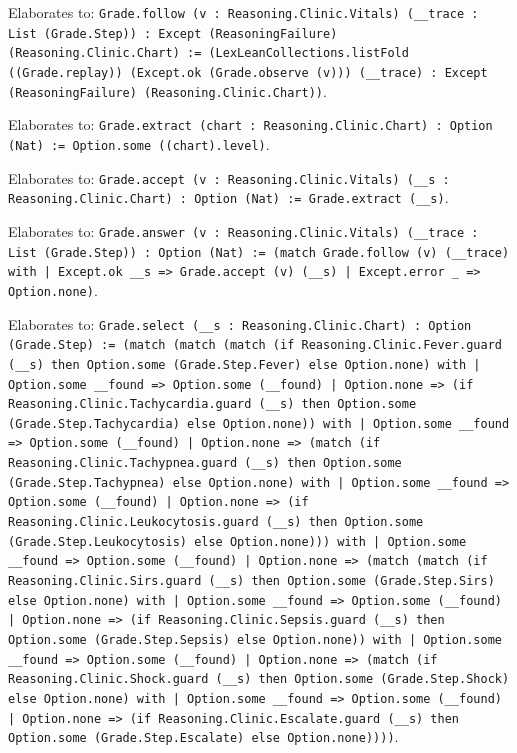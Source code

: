 \documentclass[11pt]{article}
\begin{document}
\noindent Elaborates to: \texttt{Grade.follow (v : Reasoning.Clinic.Vitals) (\_\_trace : List (Grade.Step)) : Except (ReasoningFailure) (Reasoning.Clinic.Chart) := (LexLeanCollections.listFold ((Grade.replay)) (Except.ok (Grade.observe (v))) (\_\_trace) : Except (ReasoningFailure) (Reasoning.Clinic.Chart))}.\par
\noindent Elaborates to: \texttt{Grade.extract (chart : Reasoning.Clinic.Chart) : Option (Nat) := Option.some ((chart).level)}.\par
\noindent Elaborates to: \texttt{Grade.accept (v : Reasoning.Clinic.Vitals) (\_\_s : Reasoning.Clinic.Chart) : Option (Nat) := Grade.extract (\_\_s)}.\par
\noindent Elaborates to: \texttt{Grade.answer (v : Reasoning.Clinic.Vitals) (\_\_trace : List (Grade.Step)) : Option (Nat) := (match Grade.follow (v) (\_\_trace) with | Except.ok \_\_s => Grade.accept (v) (\_\_s) | Except.error \_ => Option.none)}.\par
\noindent Elaborates to: \texttt{Grade.select (\_\_s : Reasoning.Clinic.Chart) : Option (Grade.Step) := (match (match (match (if Reasoning.Clinic.Fever.guard (\_\_s) then Option.some (Grade.Step.Fever) else Option.none) with | Option.some \_\_found => Option.some (\_\_found) | Option.none => (if Reasoning.Clinic.Tachycardia.guard (\_\_s) then Option.some (Grade.Step.Tachycardia) else Option.none)) with | Option.some \_\_found => Option.some (\_\_found) | Option.none => (match (if Reasoning.Clinic.Tachypnea.guard (\_\_s) then Option.some (Grade.Step.Tachypnea) else Option.none) with | Option.some \_\_found => Option.some (\_\_found) | Option.none => (if Reasoning.Clinic.Leukocytosis.guard (\_\_s) then Option.some (Grade.Step.Leukocytosis) else Option.none))) with | Option.some \_\_found => Option.some (\_\_found) | Option.none => (match (match (if Reasoning.Clinic.Sirs.guard (\_\_s) then Option.some (Grade.Step.Sirs) else Option.none) with | Option.some \_\_found => Option.some (\_\_found) | Option.none => (if Reasoning.Clinic.Sepsis.guard (\_\_s) then Option.some (Grade.Step.Sepsis) else Option.none)) with | Option.some \_\_found => Option.some (\_\_found) | Option.none => (match (if Reasoning.Clinic.Shock.guard (\_\_s) then Option.some (Grade.Step.Shock) else Option.none) with | Option.some \_\_found => Option.some (\_\_found) | Option.none => (if Reasoning.Clinic.Escalate.guard (\_\_s) then Option.some (Grade.Step.Escalate) else Option.none))))}.\par
\end{document}
